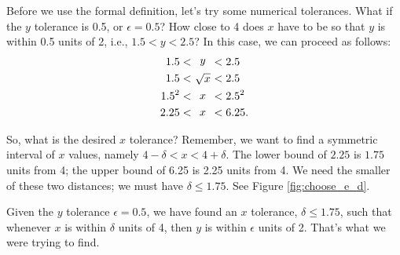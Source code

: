 {Before we use the formal definition, let's try some numerical tolerances.  What if the $y$ tolerance is 0.5, or $\epsilon =0.5$?  How close to 4 does $x$ have to be so that $y$ is within 0.5 units of 2, i.e., $1.5 < y < 2.5$?  In this case, we can proceed as follows:
\begin{align*}
1.5 &< \parbox{15pt}{\centering $y$} < 2.5 \\
1.5 &< \parbox{15pt}{\centering $\sqrt{x}$} < 2.5\\
1.5^2 &< \parbox{15pt}{\centering $x$} < 2.5^2\\
2.25 &< \parbox{15pt}{\centering $x$} < 6.25.
\end{align*}

So, what is the desired $x$ tolerance?  Remember, we want to find a symmetric interval of $x$ values, namely
$4 - \delta < x < 4 + \delta$.  The lower bound of $2.25$ is $1.75$ units from 4; the upper bound of 6.25 is 2.25 units from 4. We need the smaller of these two distances; we must have $\delta \leq 1.75$. See Figure \ref{fig:choose_e_d}.\\


		

Given the $y$ tolerance $\epsilon =0.5$, we have found an $x$ tolerance, $\delta \leq 1.75$, such that whenever $x$ is within $\delta$ units of 4, then $y$ is within $\epsilon$ units of 2.  That's what we were trying to find.\\
  
}
